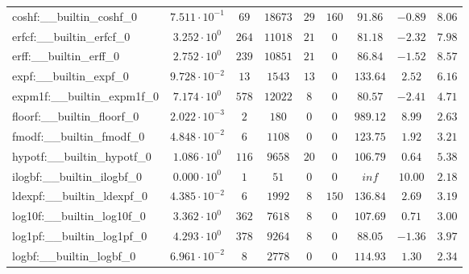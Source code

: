 \begin{tabular}{|l|c|c|c|c|c|c|c|c|}
coshf:\_\_builtin\_coshf\_0               & $ 7.511 \cdot 10^{-1} $ & $ 69     $ & $ 18673  $ & $ 29  $ & $ 160  $ & $ 91.86       $ & $ -0.89   $ & $ 8.06    $ \\
erfcf:\_\_builtin\_erfcf\_0               & $ 3.252 \cdot 10^{0}  $ & $ 264    $ & $ 11018  $ & $ 21  $ & $ 0    $ & $ 81.18       $ & $ -2.32   $ & $ 7.98    $ \\
erff:\_\_builtin\_erff\_0                 & $ 2.752 \cdot 10^{0}  $ & $ 239    $ & $ 10851  $ & $ 21  $ & $ 0    $ & $ 86.84       $ & $ -1.52   $ & $ 8.57    $ \\
expf:\_\_builtin\_expf\_0                 & $ 9.728 \cdot 10^{-2} $ & $ 13     $ & $ 1543   $ & $ 13  $ & $ 0    $ & $ 133.64      $ & $ 2.52    $ & $ 6.16    $ \\
expm1f:\_\_builtin\_expm1f\_0             & $ 7.174 \cdot 10^{0}  $ & $ 578    $ & $ 12022  $ & $ 8   $ & $ 0    $ & $ 80.57       $ & $ -2.41   $ & $ 4.71    $ \\
floorf:\_\_builtin\_floorf\_0             & $ 2.022 \cdot 10^{-3} $ & $ 2      $ & $ 180    $ & $ 0   $ & $ 0    $ & $ 989.12      $ & $ 8.99    $ & $ 2.63    $ \\
fmodf:\_\_builtin\_fmodf\_0               & $ 4.848 \cdot 10^{-2} $ & $ 6      $ & $ 1108   $ & $ 0   $ & $ 0    $ & $ 123.75      $ & $ 1.92    $ & $ 3.21    $ \\
hypotf:\_\_builtin\_hypotf\_0             & $ 1.086 \cdot 10^{0}  $ & $ 116    $ & $ 9658   $ & $ 20  $ & $ 0    $ & $ 106.79      $ & $ 0.64    $ & $ 5.38    $ \\
ilogbf:\_\_builtin\_ilogbf\_0             & $ 0.000 \cdot 10^{0}  $ & $ 1      $ & $ 51     $ & $ 0   $ & $ 0    $ & $ inf         $ & $ 10.00   $ & $ 2.18    $ \\
ldexpf:\_\_builtin\_ldexpf\_0             & $ 4.385 \cdot 10^{-2} $ & $ 6      $ & $ 1992   $ & $ 8   $ & $ 150  $ & $ 136.84      $ & $ 2.69    $ & $ 3.19    $ \\
log10f:\_\_builtin\_log10f\_0             & $ 3.362 \cdot 10^{0}  $ & $ 362    $ & $ 7618   $ & $ 8   $ & $ 0    $ & $ 107.69      $ & $ 0.71    $ & $ 3.00    $ \\
log1pf:\_\_builtin\_log1pf\_0             & $ 4.293 \cdot 10^{0}  $ & $ 378    $ & $ 9264   $ & $ 8   $ & $ 0    $ & $ 88.05       $ & $ -1.36   $ & $ 3.97    $ \\
logbf:\_\_builtin\_logbf\_0               & $ 6.961 \cdot 10^{-2} $ & $ 8      $ & $ 2778   $ & $ 0   $ & $ 0    $ & $ 114.93      $ & $ 1.30    $ & $ 2.34    $ \\

\end{tabular}
